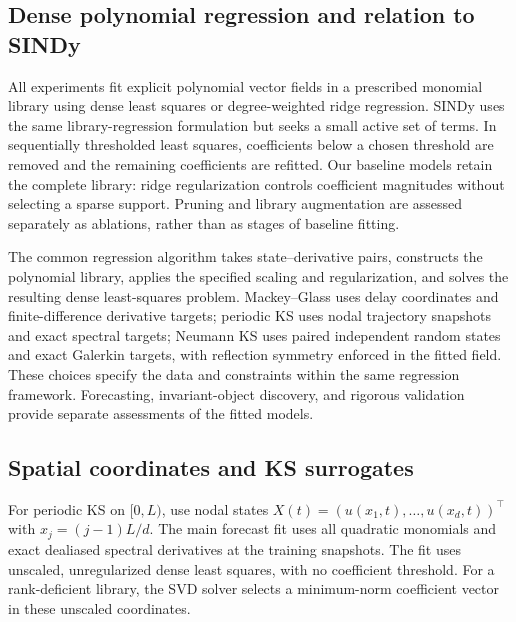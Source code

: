 \documentclass[11pt]{article}
\begin{document}
\subsection{Dense polynomial regression and relation to SINDy}
\label{sec:sindy}
All experiments fit explicit polynomial vector fields in a prescribed monomial
library using dense least squares or degree-weighted ridge regression. SINDy
\cite{brunton2016} uses the same library-regression formulation but seeks a
small active set of terms. In sequentially thresholded least squares,
coefficients below a chosen threshold are removed and the remaining
coefficients are refitted. Our baseline models retain the complete library:
ridge regularization controls coefficient magnitudes without selecting a
sparse support. Pruning and library augmentation are assessed separately as
ablations, rather than as stages of baseline fitting.

The common regression algorithm takes state--derivative pairs, constructs the
polynomial library, applies the specified scaling and regularization, and
solves the resulting dense least-squares problem. Mackey--Glass uses delay
coordinates and finite-difference derivative targets; periodic KS uses nodal
trajectory snapshots and exact spectral targets; Neumann KS uses paired
independent random states and exact Galerkin targets, with reflection
symmetry enforced in the fitted field. These choices specify the data and
constraints within the same regression framework. Forecasting, invariant-object
discovery, and rigorous validation provide separate assessments of the fitted
models.

\subsection{Spatial coordinates and KS surrogates}
For periodic KS on $[0,L)$, use nodal states
$X(t)=(u(x_1,t),\ldots,u(x_d,t))^\top$ with $x_j=(j-1)L/d$.
The main forecast fit uses all quadratic monomials and exact dealiased spectral
derivatives at the training snapshots. The fit uses unscaled, unregularized
dense least squares, with no coefficient threshold. For a rank-deficient
library, the SVD solver selects a minimum-norm coefficient vector in these
unscaled coordinates.
\end{document}
